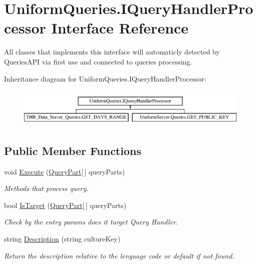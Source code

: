 \hypertarget{interface_uniform_queries_1_1_i_query_handler_processor}{}\section{Uniform\+Queries.\+I\+Query\+Handler\+Processor Interface Reference}
\label{interface_uniform_queries_1_1_i_query_handler_processor}


All classes that implements this interface will automaticly detected by Queries\+A\+PI via first use and connected to queries processing.  


Inheritance diagram for Uniform\+Queries.\+I\+Query\+Handler\+Processor\+:\begin{figure}[H]
\begin{center}
\leavevmode
\includegraphics[height=1.898305cm]{d4/dc9/interface_uniform_queries_1_1_i_query_handler_processor}
\end{center}
\end{figure}
\subsection*{Public Member Functions}
\begin{DoxyCompactItemize}
\item 
void \mbox{\hyperlink{interface_uniform_queries_1_1_i_query_handler_processor_a2cf42ac286a12dea98c703a86478d36b}{Execute}} (\mbox{\hyperlink{struct_uniform_queries_1_1_query_part}{Query\+Part}}\mbox{[}$\,$\mbox{]} query\+Parts)
\begin{DoxyCompactList}\small\item\em Methods that process query. \end{DoxyCompactList}\item 
bool \mbox{\hyperlink{interface_uniform_queries_1_1_i_query_handler_processor_a0edbfe93aab9f1787e4dc0311f7695c7}{Is\+Target}} (\mbox{\hyperlink{struct_uniform_queries_1_1_query_part}{Query\+Part}}\mbox{[}$\,$\mbox{]} query\+Parts)
\begin{DoxyCompactList}\small\item\em Check by the entry params does it target Query Handler. \end{DoxyCompactList}\item 
string \mbox{\hyperlink{interface_uniform_queries_1_1_i_query_handler_processor_ae7323367177cd11c787d61029de5b044}{Description}} (string culture\+Key)
\begin{DoxyCompactList}\small\item\em Return the description relative to the lenguage code or default if not found. \end{DoxyCompactList}\end{DoxyCompactItemize}


